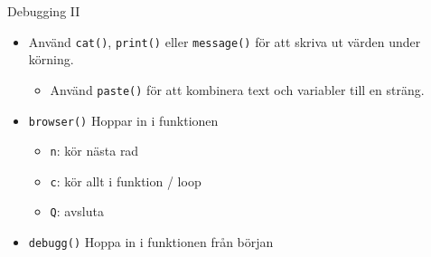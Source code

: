 \documentclass[
  11pt,
  ignorenonframetext,
]{beamer}
\providecommand{\tightlist}{%
  \setlength{\itemsep}{0pt}\setlength{\parskip}{0pt}}
\begin{document}
\begin{frame}{Debugging II}
\protect\hypertarget{debugging-ii}{}
\begin{itemize}
\tightlist
\item
  Använd \texttt{cat()}, \texttt{print()} eller \texttt{message()} för
  att skriva ut värden under körning.

  \begin{itemize}
  \tightlist
  \item
    Använd \texttt{paste()} för att kombinera text och variabler till en
    sträng.
  \end{itemize}
\item
  \texttt{browser()} Hoppar in i funktionen

  \begin{itemize}
  \tightlist
  \item
    \texttt{n}: kör nästa rad
  \item
    \texttt{c}: kör allt i funktion / loop
  \item
    \texttt{Q}: avsluta
  \end{itemize}
\item
  \texttt{debugg()} Hoppa in i funktionen från början
\end{itemize}
\end{frame}
\end{document}
